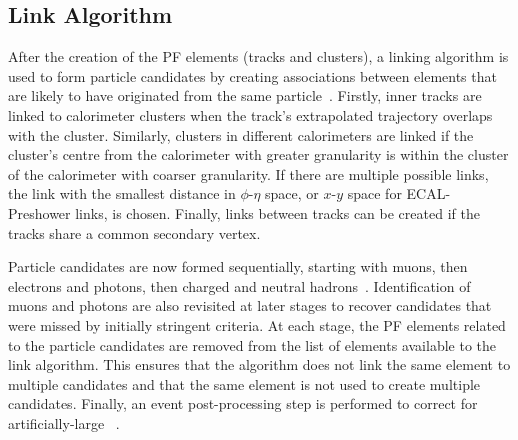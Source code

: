 \subsection{Link Algorithm}\label{sec:link_algorithm}
After the creation of the PF elements (tracks and clusters), a linking algorithm is used to form particle candidates by creating associations between elements that are likely to have originated from the same particle~\cite{CMS:2017yfk}. Firstly, inner tracks are linked to calorimeter clusters when the track's extrapolated trajectory overlaps with the cluster. Similarly, clusters in different calorimeters are linked if the cluster's centre from the calorimeter with greater granularity is within the cluster of the calorimeter with coarser granularity. If there are multiple possible links, the link with the smallest distance in $\phi$-$\eta$ space, or $x$-$y$ space for ECAL-Preshower links, is chosen. Finally, links between tracks can be created if the tracks share a common secondary vertex.

Particle candidates are now formed sequentially, starting with muons, then electrons and photons, then charged and neutral hadrons~\cite{CMS:2017yfk}. Identification of muons and photons are also revisited at later stages to recover candidates that were missed by initially stringent criteria. At each stage, the PF elements related to the particle candidates are removed from the list of elements available to the link algorithm. This ensures that the algorithm does not link the same element to multiple candidates and that the same element is not used to create multiple candidates. Finally, an event post-processing step is performed to correct for artificially-large \ptmiss~\cite{CMS:2017yfk}.